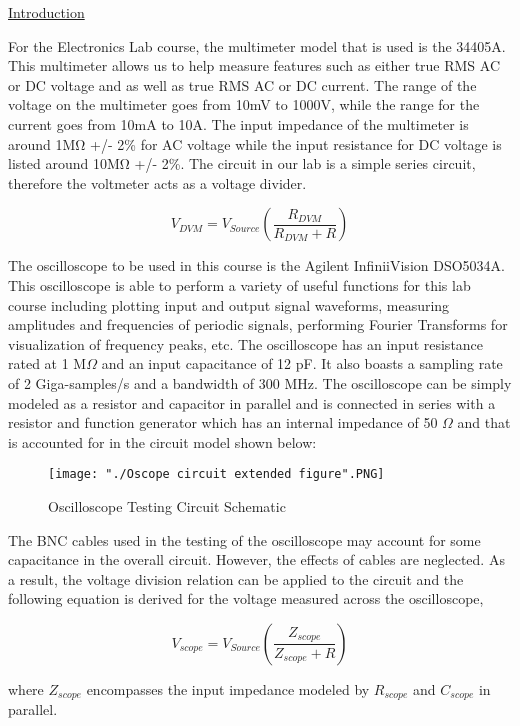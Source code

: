 \documentclass[a4paper,10pt]{article}
\begin{document}
	
\underline{Introduction}

For the Electronics Lab course, the multimeter model that is used is the 34405A. This multimeter allows us to help measure features such as either true RMS AC or DC voltage and as well as true RMS AC or DC current. The range of the voltage on the multimeter goes from 10mV to 1000V, while the range for the current goes from 10mA to 10A. The input impedance of the multimeter is around 1M\si{\ohm} +/- 2\% for AC voltage while the input resistance for DC voltage is listed around 10M\si{\ohm} +/- 2\%. The circuit in our lab is a simple series circuit, therefore the voltmeter acts as a voltage divider.

\begin{equation}
	\label{eq:vdvm}
	V_{DVM} = V_{Source}(\frac{R_{DVM}}{R_{DVM} + R}) 
\end{equation}

The oscilloscope to be used in this course is the Agilent InfiniiVision DSO5034A. This oscilloscope is able to perform a variety of useful functions for this lab course including plotting input and output signal waveforms, measuring amplitudes and frequencies of periodic signals, performing Fourier Transforms for visualization of frequency peaks, etc. The oscilloscope has an input resistance rated at 1 M$\Omega$ and an input capacitance of 12 pF. It also boasts a sampling rate of 2 Giga-samples/s and a bandwidth of 300 MHz. The oscilloscope can be simply modeled as a resistor and capacitor in parallel and is connected in series with a resistor and function generator which has an internal impedance of 50 $\Omega$ and that is accounted for in the circuit model shown below: 

\begin{figure}[h!]
	\centering
	\texttt{[image: "./Oscope circuit extended figure".PNG]}
	\caption{Oscilloscope Testing Circuit Schematic}
	\label{fig:scope_1kHz_1MOhm}
\end{figure}


The BNC cables used in the testing of the oscilloscope may account for some capacitance in the overall circuit. However, the effects of cables are neglected. As a result, the voltage division relation can be applied to the circuit and the following equation is derived for the voltage measured across the oscilloscope,

\begin{equation}
	\label{eq:vscope}
	V_{scope} = V_{Source}(\frac{Z_{scope}}{Z_{scope} + R}) 
\end{equation}
	
where $Z_{scope}$ encompasses the input impedance modeled by $R_{scope}$ and $C_{scope}$ in parallel. 
	
	
	
	
	
\end{document}
